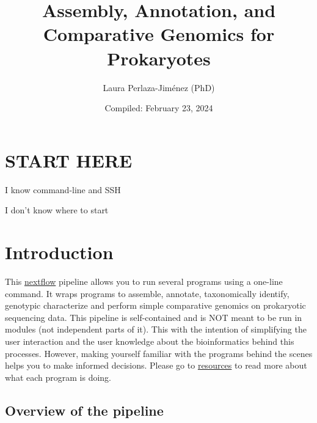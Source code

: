 \documentclass[
]{book}
\title{Assembly, Annotation, and Comparative Genomics for Prokaryotes}
\author{Laura Perlaza-Jiménez (PhD)}
\date{Compiled: February 23, 2024}
\begin{document}
\maketitle

{
\setcounter{tocdepth}{1}
\tableofcontents
}
\hypertarget{start-here}{%
\chapter{START HERE}\label{start-here}}

{I know command-line and SSH}

{I don't know where to start}

\hypertarget{introduction}{%
\chapter{Introduction}\label{introduction}}

This \href{https://www.nextflow.io/}{nextflow} pipeline allows you to run several programs using a one-line command. It wraps programs to assemble, annotate, taxonomically identify, genotypic characterize and perform simple comparative genomics on prokaryotic sequencing data. This pipeline is self-contained and is NOT meant to be run in modules (not independent parts of it). This with the intention of simplifying the user interaction and the user knowledge about the bioinformatics behind this processes. However, making yourself familiar with the programs behind the scenes helps you to make informed decisions. Please go to \href{resources.html}{resources} to read more about what each program is doing.

\hypertarget{overview-of-the-pipeline}{%
\section{Overview of the pipeline}\label{overview-of-the-pipeline}}
\end{document}
